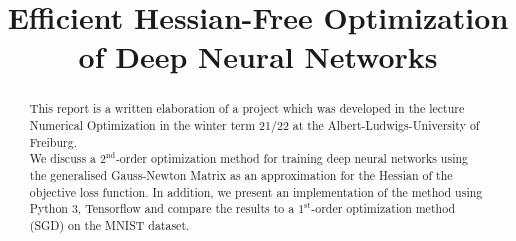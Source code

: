 \documentclass[conference]{IEEEtran}
\begin{document}
	
	\title{Efficient Hessian-Free Optimization of Deep Neural Networks
	}
	
	\author{
		\and
		\and
	}
	
	\maketitle
	\thispagestyle{plain}
	\pagestyle{plain}
	
	\begin{abstract}
		This report is a written elaboration of a project which was developed in the lecture Numerical Optimization in the winter term 21/22 at the Albert-Ludwigs-University of Freiburg.\\
		We discuss a $2^{\text{nd}}$-order optimization method for training deep neural networks using the generalised Gauss-Newton Matrix as an approximation for the Hessian of the objective loss function. In addition, we present an implementation of the method using Python 3, Tensorflow and compare the results to a $1^{\text{st}}$-order optimization method (SGD) on the MNIST dataset.
	\end{abstract}
	
\end{document}
